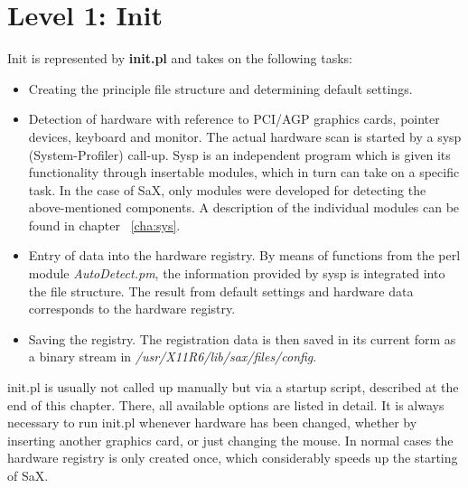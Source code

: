 \section{Level 1: Init}
\label{sec:le1}
Init is represented by  \textbf{init.pl} and takes on the following tasks:\\
\begin{itemize}
\item Creating the principle file structure and determining default settings.
\item Detection of hardware with reference to PCI/AGP graphics cards, pointer
  devices, keyboard and monitor. The actual hardware scan is started by a sysp
  (System-Profiler) call-up. Sysp is an independent program which is given its
  functionality through insertable modules, which in turn can take on a
  specific task. In the case of SaX, only modules were developed for detecting
  the above-mentioned components. A description of the individual modules can
  be found in chapter ~\ref{cha:sys}.
\item Entry of data into the hardware registry. By means of functions from the
  perl module \textit{AutoDetect.pm}, the information provided by sysp is
  integrated into the file structure. The result from default settings and
  hardware data corresponds to the hardware registry.
\item Saving the registry. The registration data is then saved in its current
  form as a binary stream in \textit{/usr/X11R6/lib/sax/files/config}. 
\end{itemize}

init.pl is usually not called up manually but via a startup script, described
at the end of this chapter. There, all available options are listed in
detail. It is always necessary to run init.pl whenever hardware has been
changed, whether by inserting another graphics card, or just changing the
mouse. In normal cases the hardware registry is only created once, which
considerably speeds up the starting of SaX. 

